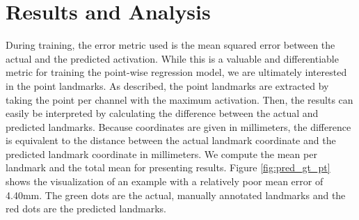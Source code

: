 \documentclass[class=article, crop=false]{standalone}
\begin{document}
\section{Results and Analysis}
\label{sec:results}
During training, the error metric used is the mean squared error between the actual and the predicted activation. While this is a valuable and differentiable metric for training the point-wise regression model, we are ultimately interested in the point landmarks. As described, the point landmarks are extracted by taking the point per channel with the maximum activation. Then, the results can easily be interpreted by calculating the difference between the actual and predicted landmarks. Because coordinates are given in millimeters, the difference is equivalent to the distance between the actual landmark coordinate and the predicted landmark coordinate in millimeters. We compute the mean per landmark and the total mean for presenting results. Figure \ref{fig:pred_gt_pt} shows the visualization of an example with a relatively poor mean error of 4.40mm. The green dots are the actual, manually annotated landmarks and the red dots are the predicted landmarks.
\end{document}
